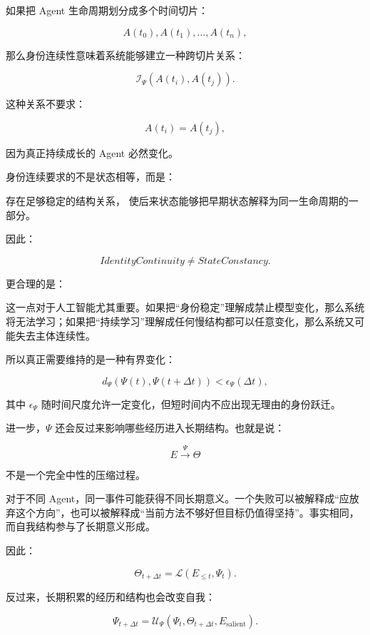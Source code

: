 如果把 Agent 生命周期划分成多个时间切片：

\[
A(t_0),
A(t_1),
\ldots,
A(t_n),
\]

那么身份连续性意味着系统能够建立一种跨切片关系：

\[
\mathcal{I}_{\Psi}
\left(
A(t_i),
A(t_j)
\right).
\]

这种关系不要求：

\[
A(t_i)=A(t_j),
\]

因为真正持续成长的 Agent 必然变化。

身份连续要求的不是状态相等，而是：

\begin{statementbox}
存在足够稳定的结构关系，
使后来状态能够把早期状态解释为同一生命周期的一部分。
\end{statementbox}

因此：

\[
IdentityContinuity
\neq
StateConstancy.
\]

更合理的是：

\begin{statementbox}
\centering
{}
\end{statementbox}

这一点对于人工智能尤其重要。如果把“身份稳定”理解成禁止模型变化，那么系统将无法学习；如果把“持续学习”理解成任何慢结构都可以任意变化，那么系统又可能失去主体连续性。

所以真正需要维持的是一种有界变化：

\[
d_{\Psi}
\left(
\Psi(t),
\Psi(t+\Delta t)
\right)
<
\epsilon_{\Psi}(\Delta t),
\]

其中 $\epsilon_{\Psi}$ 随时间尺度允许一定变化，但短时间内不应出现无理由的身份跃迁。

进一步，$\Psi$ 还会反过来影响哪些经历进入长期结构。也就是说：

\[
E
\xrightarrow{\Psi}
\Theta
\]

不是一个完全中性的压缩过程。

对于不同 Agent，同一事件可能获得不同长期意义。一个失败可以被解释成“应放弃这个方向”，也可以被解释成“当前方法不够好但目标仍值得坚持”。事实相同，而自我结构参与了长期意义形成。

因此：

\[
\Theta_{t+\Delta t}
=
\mathcal{L}
\left(
E_{\leq t},
\Psi_t
\right).
\]

反过来，长期积累的经历和结构也会改变自我：

\[
\Psi_{t+\Delta t}
=
\mathcal{U}_{\Psi}
\left(
\Psi_t,
\Theta_{t+\Delta t},
E_{\mathrm{salient}}
\right).
\]

